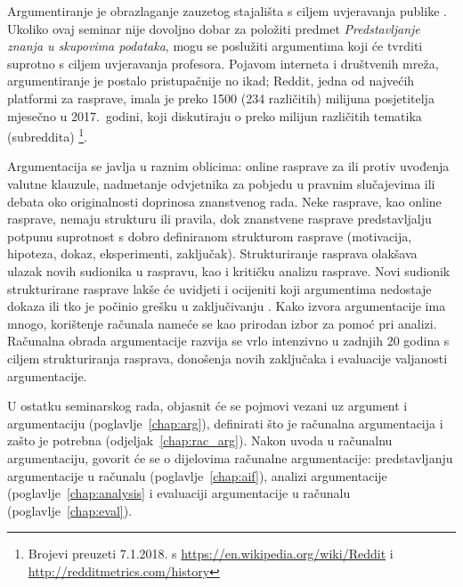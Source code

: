 Argumentiranje je obrazlaganje
zauzetog stajališta s ciljem uvjeravanja publike \citep{walton1990reasoning}.
Ukoliko ovaj seminar nije dovoljno dobar za položiti predmet
\emph{Predstavljanje znanja u skupovima podataka}, 
mogu se poslužiti argumentima koji će tvrditi suprotno s
ciljem uvjeravanja profesora. Pojavom interneta i 
društvenih mreža, 
argumentiranje je postalo pristupačnije no ikad; Reddit,
jedna od najvećih platformi za rasprave, 
imala je preko 1500 (234 različitih) milijuna posjetitelja
mjesečno u 2017.\ godini, koji 
diskutiraju o preko milijun različitih tematika (subreddita)
\footnote{Brojevi preuzeti 7.1.2018. s \url{https://en.wikipedia.org/wiki/Reddit} i 
\url{http://redditmetrics.com/history}}. 

Argumentacija se javlja u 
raznim oblicima: online rasprave
za ili protiv uvođenja valutne klauzule,
nadmetanje odvjetnika za pobjedu u pravnim slučajevima ili
debata oko originalnosti doprinosa znanstvenog rada.
Neke rasprave, kao online rasprave, nemaju 
strukturu ili pravila, dok 
znanstvene rasprave predstavljalju potpunu suprotnost 
s dobro definiranom strukturom rasprave (motivacija, hipoteza, 
dokaz, eksperimenti, zaključak). 
Strukturiranje rasprava olakšava ulazak novih sudionika
u raspravu, kao i kritičku analizu rasprave. Novi sudionik
strukturirane rasprave lakše će uvidjeti
i ocijeniti koji argumentima nedostaje dokaza
ili tko je počinio grešku u zaključivanju \citep{rieppel1992homology}. 
Kako izvora argumentacije ima mnogo, korištenje računala 
nameće se kao prirodan izbor za pomoć pri analizi. 
Računalna obrada argumentacije razvija se vrlo intenzivno u zadnjih 20 godina
s ciljem strukturiranja rasprava, 
donošenja novih zaključaka 
i evaluacije valjanosti argumentacije. 


U ostatku seminarskog rada, objasnit će se pojmovi vezani uz
argument i argumentaciju (poglavlje~\ref{chap:arg}), definirati što je
računalna argumentacija i zašto je potrebna (odjeljak~\ref{chap:rac_arg}).
Nakon uvoda u računalnu argumentaciju, govorit će se o dijelovima
računalne argumentacije: 
predstavljanju argumentacije u računalu (poglavlje~\ref{chap:aif}),
analizi argumentacije (poglavlje~\ref{chap:analysis} i
evaluaciji argumentacije u računalu (poglavlje~\ref{chap:eval}).

